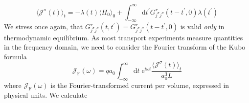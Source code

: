 \begin{equation}
    \langle \mathcal{J}^{\sigma }(t) \rangle_t = -\lambda(t) \langle H_0 \rangle_0 + \int_{-\infty}^{\infty } \mathrm{d} t^{\prime} G^r_{j^{\sigma }j^{\sigma}}(t-t^{\prime},0 ) \lambda (t^{\prime} )
\end{equation}
We stress once again, that \(G^r_{j^{\sigma }j^{\sigma }}(t,t^{\prime} ) = G^r_{j^{\sigma }j^{\sigma }}(t-t^{\prime},0 ) \)
is valid \textit{only} in thermodynamic equilibrium.
As most transport experiments measure quantities in the frequency domain,
we need to consider the Fourier transform of the Kubo formula
\begin{equation}
    \mathcal{J}_{\text{F} }(\omega ) = q a_0 \int_{-\infty}^{\infty } \mathrm{d} t \; \mathrm{e}^{i \omega t} \frac{\langle \mathcal{J}^{\sigma }(t) \rangle_t}{a_0^3 L}
\end{equation}
where \(\mathcal{J}_{\text{F} }(\omega )\) is the Fourier-transformed current per volume, expressed in physical units.
We calculate

